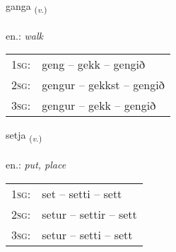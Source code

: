 \documentclass[frontgrid, backgrid]{flacards}\usepackage[]{graphicx}\usepackage[]{xcolor}
\begin{document}
\renewcommand{\flhead}{\vskip5pt \fboxsep=0pt {\small\bfseries\footnotesize Sagnorð | Verb}}
\renewcommand{\fcfoot}{\vskip5pt \fboxsep=0pt \hspace{2pt}{\small\bfseries\footnotesize 1K}}

\renewcommand{\blhead}{\vskip5pt {\small\bfseries\footnotesize Sagnorð | Verb }}
\renewcommand{\bcfoot}{\vskip5pt \hspace{2pt}{\small\bfseries\footnotesize 1K}}


{ganga \small{\textsubscript{(\textit{v.})}} \\[1ex] %
\textphonetic{[kauŋka]} \\
en.: \emph{walk} \\  [2ex]
\renewcommand*{\arraystretch}{0.8}
\begin{tabular}{p{1cm}l}
\textsc{1sg}: & geng -- gekk -- gengið \\ 
\textsc{2sg}: & gengur -- gekkst -- gengið \\ 
\textsc{3sg}: & gengur -- gekk -- gengið \\ 
\end{tabular}
}

\renewcommand{\flhead}{\vskip5pt \fboxsep=0pt {\small\bfseries\footnotesize Sagnorð | Verb}}
\renewcommand{\fcfoot}{\vskip5pt \fboxsep=0pt \hspace{2pt}{\small\bfseries\footnotesize 1K}}

\renewcommand{\blhead}{\vskip5pt {\small\bfseries\footnotesize Sagnorð | Verb }}
\renewcommand{\bcfoot}{\vskip5pt \hspace{2pt}{\small\bfseries\footnotesize 1K}}


{setja \small{\textsubscript{(\textit{v.})}} \\[1ex] %
\textphonetic{[sɛːtja]} \\
en.: \emph{put, place} \\  [2ex]
\renewcommand*{\arraystretch}{0.8}
\begin{tabular}{p{1cm}l}
\textsc{1sg}: & set -- setti -- sett \\ 
\textsc{2sg}: & setur -- settir -- sett \\ 
\textsc{3sg}: & setur -- setti -- sett \\ 
\end{tabular}
}
\end{document}
